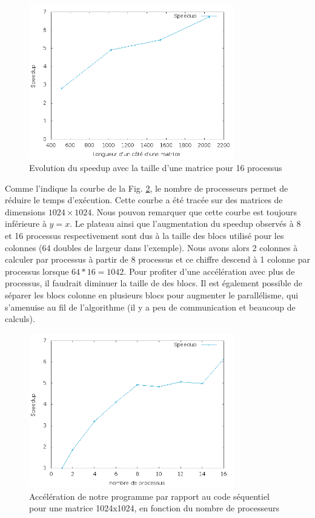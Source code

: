 \begin{figure}[H]
\centering
\includegraphics[width=0.8\textwidth]{sp-size.png}
\caption{Evolution du speedup avec la taille d'une matrice pour 16 processus}
\label{fig:sp-size}
\end{figure}

Comme l'indique la courbe de la Fig. \ref{fig:sp-proc}, le nombre de processeurs permet de réduire le temps d'exécution. Cette courbe a été tracée sur des matrices de dimensions $1024\times1024$. Nous pouvon remarquer que cette courbe est toujours inférieure à $y = x$. Le plateau ainsi que l'augmentation du speedup observés à 8 et 16 processus respectivement sont dus à la taille des blocs utilisé pour les colonnes (64 doubles de largeur dans l'exemple). Nous avons alors 2 colonnes à calculer par processus à partir de 8 processus et ce chiffre descend à 1 colonne par processus lorsque $64*16 = 1042$. Pour profiter d'une accélération avec plus de processus, il faudrait diminuer la taille de des blocs. Il est également possible de séparer les blocs colonne en plusieurs blocs pour augmenter le parallélisme, qui s'amenuise au fil de l'algorithme (il y a peu de communication et beaucoup de calculs).

\begin{figure}[H]
\centering
\includegraphics[width=0.8\textwidth]{sp-proc.png}
\caption{Accélération de notre programme par rapport au code séquentiel pour une matrice 1024x1024, en fonction du nombre de processeurs}
\label{fig:sp-proc}
\end{figure}

